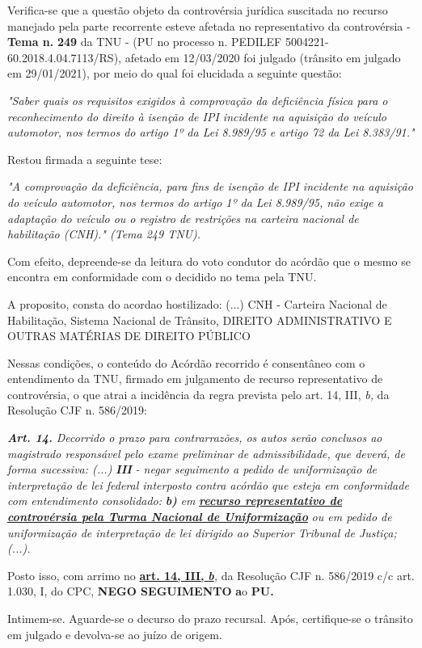 \documentclass[12pt]{article}
\begin{document}
\justifying
\noindent Verifica-se que a questão objeto da controvérsia jurídica suscitada no recurso manejado pela parte recorrente esteve afetada no representativo da controvérsia - \textbf{Tema n. }\textbf{249} da TNU - (PU no processo n. PEDILEF 5004221-60.2018.4.04.7113/RS),  afetado em 12/03/2020 foi julgado (trânsito em julgado em 29/01/2021), por meio do qual foi elucidada a seguinte questão:

\noindent \textit{"Saber quais os requisitos exigidos à comprovação da deficiência física para o reconhecimento do direito à isenção de IPI incidente na aquisição do veículo automotor, nos termos do artigo 1º da Lei 8.989/95 e artigo 72 da Lei 8.383/91."}

\noindent Restou firmada a seguinte tese:

\noindent \textit{"A comprovação da deficiência, para fins de isenção de IPI incidente na aquisição do veículo automotor, nos termos do artigo 1º da Lei 8.989/95, não exige a adaptação do veículo ou o registro de restrições na carteira nacional de habilitação (CNH)." (Tema 249 TNU).}

\noindent Com efeito, depreende-se da leitura do voto condutor do acórdão que o mesmo se encontra em conformidade com o decidido no  tema pela TNU.

\noindent A proposito, consta do acordao hostilizado: (...) CNH - Carteira Nacional de Habilitação, Sistema Nacional de Trânsito, DIREITO ADMINISTRATIVO E OUTRAS MATÉRIAS DE DIREITO PÚBLICO

\noindent Nessas condições, o conteúdo do Acórdão recorrido é consentâneo com o entendimento da TNU, firmado em julgamento de recurso representativo de controvérsia, o que atrai a incidência da regra prevista pelo art. 14, III, \textit{b,} da Resolução CJF n. 586/2019:

\noindent \textit{\textbf{Art. 14.}}\textit{ Decorrido o prazo para contrarrazões, os autos serão conclusos ao magistrado responsável pelo exame preliminar de admissibilidade, que deverá, de forma sucessiva: (...) }\textit{\textbf{III }}\textit{- negar seguimento a pedido de uniformização de interpretação de lei federal interposto contra acórdão que esteja em conformidade com entendimento consolidado: }\textit{\textbf{b)}}\textit{ em }\uline{\textit{\textbf{recurso representativo de controvérsia pela Turma Nacional de Uniformização}}}\textit{ ou em pedido de uniformização de interpretação de lei dirigido ao Superior Tribunal de Justiça;(...).}

\noindent Posto isso, com arrimo no \uline{\textbf{art. 14, III, }}\uline{\textit{\textbf{b}}}\textit{,} da Resolução CJF n. 586/2019 c/c art. 1.030, I, do CPC, \textbf{NEGO SEGUIMENTO }\textbf{a}o\textbf{ PU}\textbf{.}

\noindent Intimem-se. Aguarde-se o decurso do prazo recursal. Após, certifique-se o trânsito em julgado e devolva-se ao juízo de origem.
\end{document}
